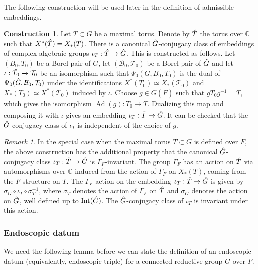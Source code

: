 \documentclass[11pt,a4paper]{article}
\theoremstyle{definition}
\newtheorem{const}[shared]{Construction}
\theoremstyle{plain}
\theoremstyle{remark}
\newtheorem{R}[shared]{Remark}
\theoremstyle{plain}
\DeclareMathOperator{\Int}{Int}
\DeclareMathOperator{\Ad}{Ad}
\begin{document}
The following construction will be used later in the definition of admissible embeddings.

\begin{const}\label{firstconst}
    Let $T \subset G$ be a maximal torus. Denote by $\Hat{T}$ the torus over $\mathbb{C}$ such that $X^*(\Hat{T}) = X_*(T)$. There is a canonical $\Hat{G}$-conjugacy class of embeddings of complex algebraic groups $\iota_T: \Hat{T} \xrightarrow[]{} \Hat{G}$. This is constructed as follows. Let $(B_0, T_0)$ be a Borel pair of $G$, let $(\mathcal{B}_0, \mathcal{T}_0)$ be a Borel pair of $\Hat{G}$ and let $\iota: \Hat{T_0} \xrightarrow[]{} \mathcal{T}_0$ be an isomorphism such that $\Psi_0(G,B_0,T_0)$ is the dual of $\Psi_0(\Hat{G}, \mathcal{B}_0, \mathcal{T}_0)$ under the identifications $X^*(T_0) \simeq X_*(\mathcal{T}_0)$ and $X_*(T_0) \simeq X^*(\mathcal{T}_0)$ induced by $\iota$. Choose $g \in G(\overline{F})$ such that $g T_0 g^{-1} = T$, which gives the isomorphism $\Ad(g): T_0 \xrightarrow[]{} T$. Dualizing this map and composing it with $\iota$ gives an embedding $\iota_T: \Hat{T} \xrightarrow[]{} \Hat{G}$. It can be checked that the $\Hat{G}$-conjugacy class of $\iota_T$ is independent of the choice of $g$.
\end{const}

\begin{R}\label{secondconst}
    In the special case when the maximal torus $T \subset G$ is defined over $F$, the above construction has the additional property that the canonical $\Hat{G}$-conjugacy class $\iota_T: \Hat{T} \xrightarrow[]{} \Hat{G}$ is $\Gamma_F$-invariant. The group $\Gamma_F$ has an action on $\Hat{T}$ via automorphisms over $\mathbb{C}$ induced from the action of $\Gamma_F$ on $X_*(T)$, coming from the $F$-structure on $T$. The $\Gamma_F$-action on the embedding $\iota_T: \Hat{T} \xrightarrow[]{} \Hat{G}$ is given by $\sigma_G \circ \iota_T \circ \sigma_T^{-1}$, where $\sigma_T$ denotes the action of $\Gamma_F$ on $\Hat{T}$ and $\sigma_G$ denotes the action on $\Hat{G}$, well defined up to $\Int(\Hat{G})$. The $\Hat{G}$-conjugacy class of $\iota_T$ is invariant under this action.
\end{R}

\subsubsection{Endoscopic datum}
We need the following lemma before we can state the definition of an endoscopic datum (equivalently, endoscopic triple) for a connected reductive group $G$ over $F$.
\end{document}
